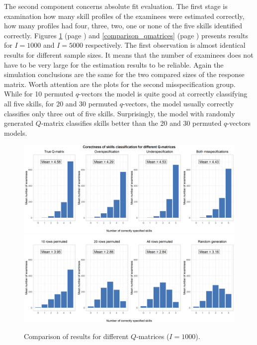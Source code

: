 \documentclass[english]{pwr_wmat_praca_dyplomowa}
\theoremstyle{plain}
\numberwithin{theorem}{chapter}
\theoremstyle{definition}
\numberwithin{theorem}{chapter}
\begin{document}
	\newpage
	The second component concerns absolute fit evaluation. The first stage is examination how many skill profiles of the examinees were estimated correctly, how many profiles had four, three, two, one or none
	of the five skills identified correctly. Figures \ref{comparison_qmatrices1000} (page \pageref{comparison_qmatrices1000}) and \ref{comparison_qmatrices} (page \pageref{comparison_qmatrices}) presents results for $I=1000$ and $I=5000$ respectively. The first observation is almost identical results for different sample sizes. It means that the number of examinees does not have to be very large for the estimation results to be reliable. Again the simulation conclusions are the same for the two compared sizes of the response matrix. Worth attention are the plots for the second misspecification group. While for 10 permuted $q$-vectors the model is quite good at correctly classifying all five skills, for 20 and 30 permuted $q$-vectors, the model usually correctly classifies only three out of five skills. Surprisingly, the model with randomly generated $Q$-matrix classifies skills better than the 20 and 30 permuted $q$-vectors models.
	
	\begin{figure}[ht]
		\centering
		\includegraphics[width=\textwidth]{Qmat_skills_classification_1000_col.png}
		\includegraphics[width=\textwidth]{Qmat_skills_classification2_1000_col.png}
		\caption{Comparison of results for different $Q$-matrices ($I=1000$).}
		\label{comparison_qmatrices1000}
	\end{figure}
	
\end{document}
